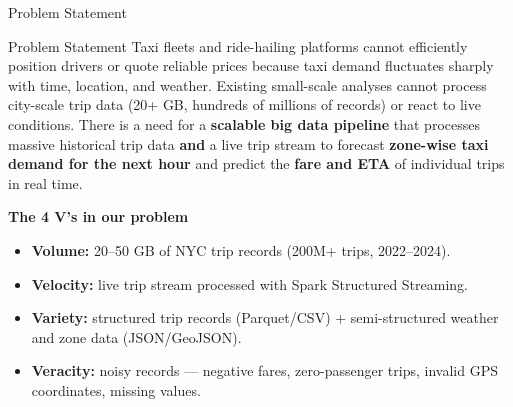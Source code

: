\documentclass[aspectratio=169]{beamer}
\begin{document}
\begin{frame}{Problem Statement}
  \begin{block}{Problem Statement}
    Taxi fleets and ride-hailing platforms cannot efficiently position drivers or
    quote reliable prices because taxi demand fluctuates sharply with time,
    location, and weather. Existing small-scale analyses cannot process
    city-scale trip data (20+ GB, hundreds of millions of records) or react to
    live conditions. There is a need for a \textbf{scalable big data pipeline}
    that processes massive historical trip data \textbf{and} a live trip stream
    to forecast \textbf{zone-wise taxi demand for the next hour} and predict the
    \textbf{fare and ETA} of individual trips in real time.
  \end{block}
  \vspace{4pt}
  \textbf{The 4 V's in our problem}
  \begin{itemize}
    \item \textbf{Volume:} 20--50 GB of NYC trip records (200M+ trips, 2022--2024).
    \item \textbf{Velocity:} live trip stream processed with Spark Structured Streaming.
    \item \textbf{Variety:} structured trip records (Parquet/CSV) + semi-structured
          weather and zone data (JSON/GeoJSON).
    \item \textbf{Veracity:} noisy records --- negative fares, zero-passenger trips,
          invalid GPS coordinates, missing values.
  \end{itemize}
\end{frame}
\end{document}
